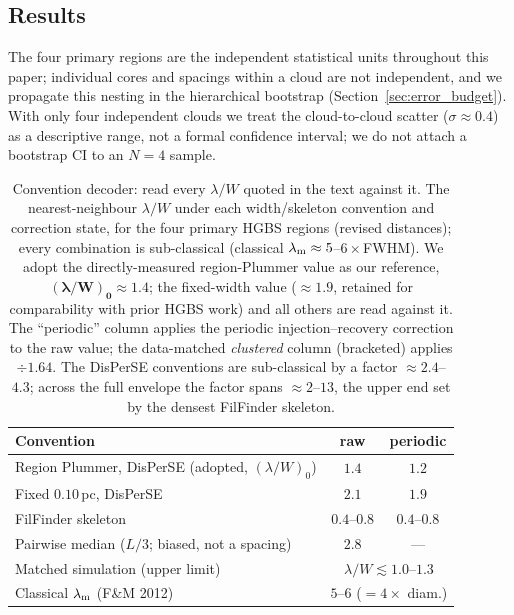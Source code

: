 \documentclass[usenatbib,twoside,twocolumn]{mnras}
\begin{document}
\subsection{Results}

The four primary regions are the independent statistical units throughout this paper; individual cores and spacings within a cloud are not independent, and we propagate this nesting in the hierarchical bootstrap (Section~\ref{sec:error_budget}). With only four independent clouds we treat the cloud-to-cloud scatter ($\sigma\approx0.4$) as a descriptive range, not a formal confidence interval; we do not attach a bootstrap CI to an $N=4$ sample.

\begin{table}
\caption{Convention decoder: read every $\lambda/W$ quoted in the text against it. The nearest-neighbour $\lambda/W$ under each width/skeleton convention and correction state, for the four primary HGBS regions (revised distances); every combination is sub-classical (classical $\lambda_{\rm m}\approx5$--$6\times$FWHM). We adopt the directly-measured region-Plummer value as our reference, $\boldsymbol{(\lambda/W)_0\approx1.4}$; the fixed-width value ($\approx1.9$, retained for comparability with prior HGBS work) and all others are read against it. The ``periodic'' column applies the periodic injection--recovery correction to the raw value; the data-matched \emph{clustered} column (bracketed) applies $\div1.64$. The DisPerSE conventions are sub-classical by a factor $\approx2.4$--$4.3$; across the full envelope the factor spans $\approx2$--$13$, the upper end set by the densest FilFinder skeleton.}
\label{tab:headline}
\footnotesize
\setlength{\tabcolsep}{4pt}
\begin{tabular}{p{4.2cm}cc}
\toprule
Convention & raw & periodic \\
\midrule
Region Plummer, DisPerSE (adopted, $(\lambda/W)_0$) & $\mathbf{1.4}$ & $1.2$ \\
Fixed $0.10$\,pc, DisPerSE & $2.1$ & $1.9$ \\
FilFinder skeleton & $0.4$--$0.8$ & $0.4$--$0.8$ \\
Pairwise median ($L/3$; biased, not a spacing) & $2.8$ & --- \\
\midrule
Matched simulation (upper limit) & \multicolumn{2}{c}{$\lambda/W\lesssim1.0$--$1.3$} \\
Classical $\lambda_{\rm m}$ (F\&M 2012) & \multicolumn{2}{c}{$5$--$6$ ($=4\times$ diam.)} \\
\bottomrule
\end{tabular}

\end{table}
\end{document}
